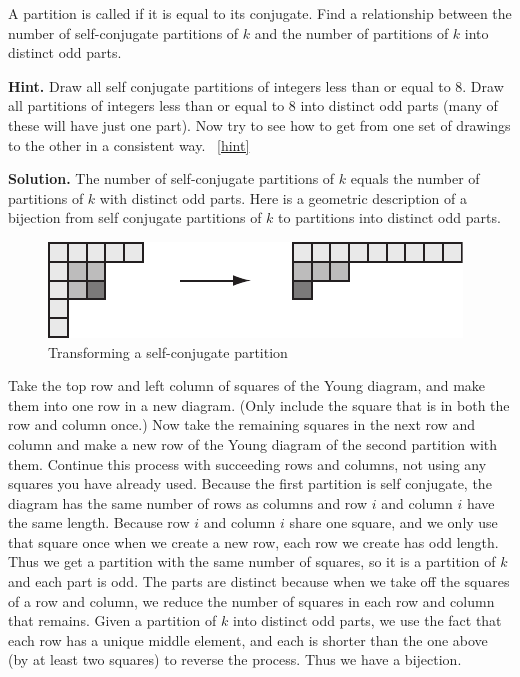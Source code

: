 \documentclass{book}
\begin{document}
\setcounter{project}{305}
\addtocounter{project}{-1}
\begin{activity}[]\label{activity-298}
\hypertarget{p-1534}{}%
A partition is called  if it is equal to its conjugate. Find a relationship between the number of self-conjugate partitions of \(k\) and the number of partitions of \(k\) into distinct odd parts.%
\par\smallskip%
\noindent\textbf{Hint.}\hypertarget{hint-191}{}\quad%
\hypertarget{p-1535}{}%
Draw all self conjugate partitions of integers less than or equal to 8.  Draw all partitions of integers less than or equal to 8 into distinct odd parts (many of these will have just one part). Now try to see how to get from one set of drawings to the other in a consistent way.%
~\hfill{\tiny\hyperlink{a-305}{[hint]}\hypertarget{q-305}{}}\par\smallskip%
\noindent\textbf{Solution.}\hypertarget{solution-203}{}\quad%
\hypertarget{p-1536}{}%
The number of self-conjugate partitions of \(k\) equals the number of partitions of \(k\) with distinct odd parts. Here is a geometric description of a bijection from self conjugate partitions of \(k\) to partitions into distinct odd parts.%
\begin{figure}
\centering
\includegraphics[width=0.6\linewidth]{images/selfconjugate}
\caption{Transforming a self-conjugate partition\label{selfconjugate-to-distinctodd}}
\end{figure}
\hypertarget{p-1537}{}%
Take the top row and left column of squares of the Young diagram, and make them into one row in a new diagram. (Only include the square that is in both the row and column once.) Now take the remaining squares in the next row and column and make a new row of the Young diagram of the second partition with them. Continue this process with succeeding rows and columns, not using any squares you have already used. Because the first partition is self conjugate, the diagram has the same number of rows as columns and row \(i\) and column \(i\) have the same length. Because row \(i\) and column \(i\) share one square, and we only use that square once when we create a new row, each row we create has odd length. Thus we get a partition with the same number of squares, so it is a partition of \(k\) and each part is odd. The parts are distinct because when we take off the squares of a row and column, we reduce the number of squares in each row and column that remains. Given a partition of \(k\) into distinct odd parts, we use the fact that each row has a unique middle element, and each is shorter than the one above (by at least two squares) to reverse the process. Thus we have a bijection.%
\end{activity}
\end{document}
